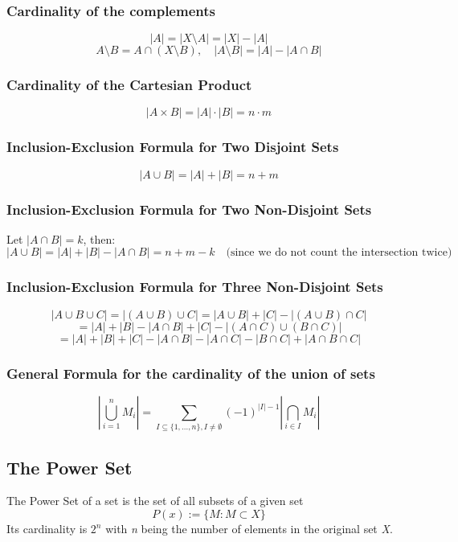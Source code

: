 \subsubsection*{Cardinality of the complements}
\[
	|A| = |X \setminus A| = |X| - |A|
\]
\[
	A \setminus B = A \cap (X \setminus B), \quad |A \setminus B| = |A| - |A \cap B|
\]

\subsubsection*{Cardinality of the Cartesian Product}
\[
	|A \times B| = |A| \cdot |B| = n \cdot m
\]

\subsubsection*{Inclusion-Exclusion Formula for Two Disjoint Sets}
\[
	|A \cup B| = |A| + |B| = n + m
\]

\subsubsection*{Inclusion-Exclusion Formula for Two Non-Disjoint Sets}
Let \( |A \cap B| = k \), then:
\[
	|A \cup B| = |A| + |B| - |A \cap B| = n + m - k \quad \text{(since we do not count the intersection twice)}
\]

\subsubsection*{Inclusion-Exclusion Formula for Three Non-Disjoint Sets}
\[
	|A \cup B \cup C| = |(A \cup B) \cup C| = |A \cup B| + |C| - |(A \cup B) \cap C|
\]
\[
	= |A| + |B| - |A \cap B| + |C| - |(A \cap C) \cup (B \cap C)|
\]
\[
	= |A| + |B| + |C| - |A \cap B| - |A \cap C| - |B \cap C| + |A \cap B \cap C|
\]

\subsubsection{General Formula for the cardinality of the union of sets}

\[
	\left\vert \bigcup_{i = 1}^n M_i \right\vert  = \sum_{I \subseteq \{1, \dots, n\}, I \neq \emptyset}(-1)^{|I| - 1} \left\vert \bigcap_{i \in I} M_i \right\vert
\]

\subsection{The Power Set}
The Power Set of a set is the set of all subsets of a given set \[
	P(x):= \{ M: M \subset X\}
\]
Its cardinality is \(2^n\) with \emph{n} being the number of elements in the original set \textit{X}.

